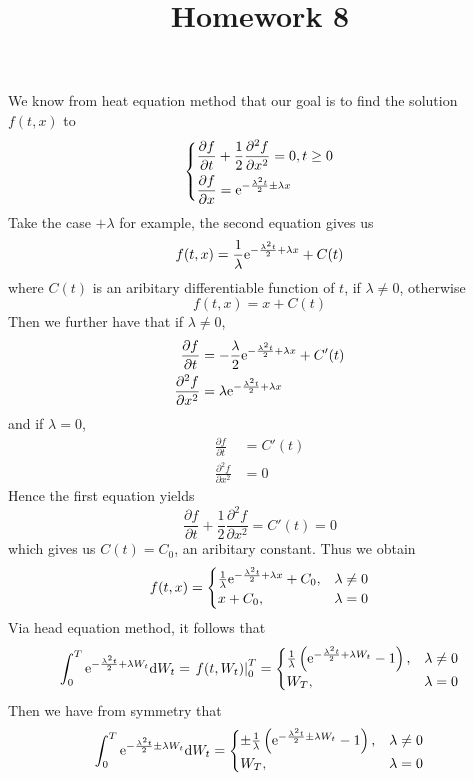 \documentclass{homework}
\title{Homework 8}
\begin{document}
    \maketitle

    \problem
    \begin{subproblem}[(\alph*)]
        \item
        We know from heat equation method that
        our goal is to find the solution $f(t,x)$ to
        \[\left\{\begin{aligned}
            &\frac{\partial f}{\partial t}+\frac{1}{2}\frac{\partial^2 f}{\partial x^2}=0,t\geq 0\\
            &\frac{\partial f}{\partial x}=\mathrm e^{-\frac{\lambda^2t}{2}\pm\lambda x}\\
        \end{aligned}\right.\]
        Take the case $+\lambda$ for example, the second equation gives
        us
        \[f(t,x)=\frac{1}{\lambda}\mathrm e^{-\frac{\lambda^2t}{2}+\lambda x}+C(t)\]
        where $C(t)$ is an aribitary differentiable function of $t$, if $\lambda\neq 0$, otherwise
        \[f(t,x)=x+C(t)\]
        Then we further have that if $\lambda\neq 0$,
        \[\begin{aligned}
            \frac{\partial f}{\partial t}
            &=-\frac{\lambda}{2}\mathrm e^{-\frac{\lambda^2t}{2}+\lambda x}+C'(t)\\
            \frac{\partial^2 f}{\partial x^2}
            &=\lambda\mathrm e^{-\frac{\lambda^2t}{2}+\lambda x}
        \end{aligned}\]
        and if $\lambda=0$,
        \[\begin{aligned}
            \frac{\partial f}{\partial t}
            &=C'(t)\\
            \frac{\partial^2 f}{\partial x^2}
            &=0
        \end{aligned}\]
        Hence the first equation yields
        \[\frac{\partial f}{\partial t}+\frac{1}{2}\frac{\partial^2 f}{\partial x^2}
        =C'(t)=0\]
        which gives us $C(t)=C_0$, an aribitary constant.
        Thus we obtain
        \[f(t,x)=\begin{cases}
            \frac{1}{\lambda}\mathrm e^{-\frac{\lambda^2t}{2}+\lambda x}+C_0,&\lambda\neq 0\\
            x+C_0,&\lambda=0
        \end{cases}\]
        Via head equation method, it follows that
        \[\int_0^T\mathrm e^{-\frac{\lambda^2t}{2}+\lambda W_t}\mathrm d W_t
        =\left.f(t,W_t)\right|_0^T
        =\begin{cases}
        \frac{1}{\lambda}\left(\mathrm e^{-\frac{\lambda^2t}{2}+\lambda W_t}-1\right),&\lambda\neq 0\\
        W_T,&\lambda=0
        \end{cases}\]
        Then we have from symmetry that
        \[\int_0^T\mathrm e^{-\frac{\lambda^2t}{2}\pm\lambda W_t}\mathrm d W_t
        =\begin{cases}
        \pm\frac{1}{\lambda}\left(\mathrm e^{-\frac{\lambda^2t}{2}\pm\lambda W_t}-1\right),&\lambda\neq 0\\
        W_T,&\lambda=0
        \end{cases}\]
        

\end{subproblem}
\end{document}
